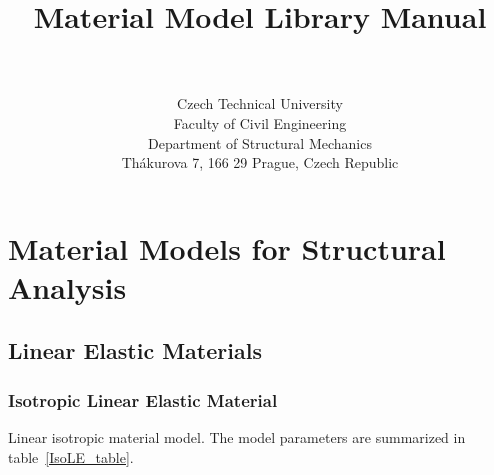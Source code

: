 \documentclass[epsf,a4paper]{article}
\begin{document}
\title{\oofem Material Model Library Manual}
\author{\bp \\ \\
Czech Technical University\\
Faculty of Civil Engineering\\
Department of Structural Mechanics\\
Th\'akurova 7, 166 29 Prague, Czech Republic
}
\maketitle

\newpage
\tableofcontents
\listoftables
\section{Material Models for Structural Analysis}
\subsection{Linear Elastic Materials}
\subsubsection{Isotropic Linear Elastic Material}
\label{IsoLE}
Linear isotropic material model. The model parameters are summarized
in table~\ref{IsoLE_table}.
\end{document}
